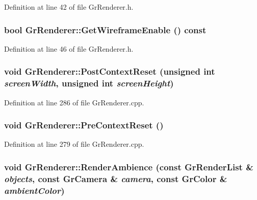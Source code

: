 Definition at line 42 of file GrRenderer.h.\hypertarget{class_gr_renderer_a33160de78d4900342c11166d1658913}{
\subsubsection[{GetWireframeEnable}]{\setlength{\rightskip}{0pt plus 5cm}bool GrRenderer::GetWireframeEnable () const}}
\label{class_gr_renderer_a33160de78d4900342c11166d1658913}




Definition at line 46 of file GrRenderer.h.\hypertarget{class_gr_renderer_ce226ce944cecd180bc8aa02173cee3b}{
\subsubsection[{PostContextReset}]{\setlength{\rightskip}{0pt plus 5cm}void GrRenderer::PostContextReset (unsigned int {\em screenWidth}, \/  unsigned int {\em screenHeight})}}
\label{class_gr_renderer_ce226ce944cecd180bc8aa02173cee3b}




Definition at line 286 of file GrRenderer.cpp.\hypertarget{class_gr_renderer_92f2baaa0b18549e04bc8e5361cfe676}{
\subsubsection[{PreContextReset}]{\setlength{\rightskip}{0pt plus 5cm}void GrRenderer::PreContextReset ()}}
\label{class_gr_renderer_92f2baaa0b18549e04bc8e5361cfe676}




Definition at line 279 of file GrRenderer.cpp.\hypertarget{class_gr_renderer_2ab0a1175b2450e0ed213d7d06b5e18e}{
\subsubsection[{RenderAmbience}]{\setlength{\rightskip}{0pt plus 5cm}void GrRenderer::RenderAmbience (const {\bf GrRenderList} \& {\em objects}, \/  const {\bf GrCamera} \& {\em camera}, \/  const {\bf GrColor} \& {\em ambientColor})}}
\label{class_gr_renderer_2ab0a1175b2450e0ed213d7d06b5e18e}




